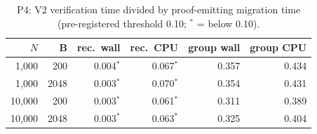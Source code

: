\begin{table}[t]
  \centering
  \caption{P4: V2 verification time divided by proof-emitting migration time (pre-registered threshold 0.10; $^{\ast}$ = below 0.10).}
  \label{tab:p4}
  \begin{tabular}{rrrrrr}
    \toprule
    $N$ & B & rec.\ wall & rec.\ CPU & group wall & group CPU \\
    \midrule
    1{,}000 & 200 & 0.004$^{\ast}$ & 0.067$^{\ast}$ & 0.357 & 0.434 \\
    1{,}000 & 2048 & 0.003$^{\ast}$ & 0.070$^{\ast}$ & 0.354 & 0.431 \\
    10{,}000 & 200 & 0.003$^{\ast}$ & 0.061$^{\ast}$ & 0.311 & 0.389 \\
    10{,}000 & 2048 & 0.003$^{\ast}$ & 0.063$^{\ast}$ & 0.325 & 0.404 \\
    \bottomrule
  \end{tabular}
\end{table}
